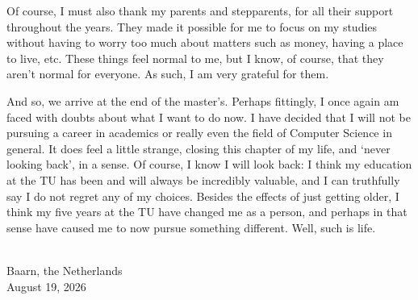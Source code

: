 Of course, I must also thank my parents and stepparents, for all their support throughout the years. They made it possible for me to focus on my studies without having to worry too much about matters such as money, having a place to live, etc. These things feel normal to me, but I know, of course, that they aren't normal for everyone. As such, I am very grateful for them.

And so, we arrive at the end of the master's. Perhaps fittingly, I once again am faced with doubts about what I want to do now. I have decided that I will not be pursuing a career in academics or really even the field of Computer Science in general. It does feel a little strange, closing this chapter of my life, and `never looking back', in a sense. Of course, I know I will look back: I think my education at the TU has been and will always be incredibly valuable, and I can truthfully say I do not regret any of my choices. Besides the effects of just getting older, I think my five years at the TU have changed me as a person, and perhaps in that sense have caused me to now pursue something different. Well, such is life.

\vspace{1cm}
\begin{flushright}
\theauthor{}\\
Baarn, the Netherlands\\
August 19, 2026\\
\end{flushright}
